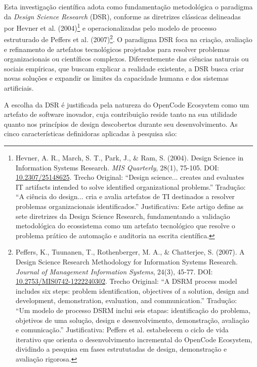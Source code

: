 \documentclass[12pt,a4paper,oneside]{abntex2}
\begin{document}
Esta investigação científica adota como fundamentação metodológica o paradigma da \textit{Design Science Research} (DSR), conforme as diretrizes clássicas delineadas por Hevner et al. (2004)\footnote{Hevner, A. R., March, S. T., Park, J., \& Ram, S. (2004). Design Science in Information Systems Research. \textit{MIS Quarterly}, 28(1), 75-105. DOI: \href{https://doi.org/10.2307/25148625}{10.2307/25148625}. Trecho Original: ``Design science... creates and evaluates IT artifacts intended to solve identified organizational problems.'' Tradução: ``A ciência do design... cria e avalia artefatos de TI destinados a resolver problemas organizacionais identificados.'' Justificativa: Este artigo define as sete diretrizes da Design Science Research, fundamentando a validação metodológica do ecossistema como um artefato tecnológico que resolve o problema prático de automação e auditoria na escrita científica.} e operacionalizadas pelo modelo de processo estruturado de Peffers et al. (2007)\footnote{Peffers, K., Tuunanen, T., Rothenberger, M. A., \& Chatterjee, S. (2007). A Design Science Research Methodology for Information Systems Research. \textit{Journal of Management Information Systems}, 24(3), 45-77. DOI: \href{https://doi.org/10.2753/MIS0742-1222240302}{10.2753/MIS0742-1222240302}. Trecho Original: ``A DSRM process model includes six steps: problem identification, objectives of a solution, design and development, demonstration, evaluation, and communication.'' Tradução: ``Um modelo de processo DSRM inclui seis etapas: identificação do problema, objetivos de uma solução, design e desenvolvimento, demonstração, avaliação e comunicação.'' Justificativa: Peffers et al. estabelecem o ciclo de vida iterativo que orienta o desenvolvimento incremental do OpenCode Ecosystem, dividindo a pesquisa em fases estrututadas de design, demonstração e avaliação rigorosa.}. O paradigma DSR foca na criação, avaliação e refinamento de artefatos tecnológicos projetados para resolver problemas organizacionais ou científicos complexos. Diferentemente das ciências naturais ou sociais empíricas, que buscam explicar a realidade existente, a DSR busca criar novas soluções e expandir os limites da capacidade humana e dos sistemas artificiais.

A escolha da DSR é justificada pela natureza do OpenCode Ecosystem como um artefato de software inovador, cuja contribuição reside tanto na sua utilidade quanto nos princípios de design descobertos durante seu desenvolvimento. As cinco características definidoras aplicadas à pesquisa são:
\end{document}

